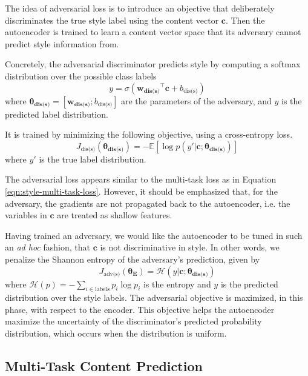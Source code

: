 \documentclass[letterpaper]{article} %
\newcommand{\loss}[1]{J_{\text{#1}}}
\newcommand{\nnweight}[1]{\bm{\theta_{\text{#1}}}}
\newcommand{\weight}[1]{\bm{w_{\text{#1}}}}
\newcommand{\bias}[1]{b_{\text{#1}}}
\begin{document}
The idea of adversarial loss is to introduce an objective that deliberately discriminates the true style label using the content vector $\bm c$.
Then the autoencoder is trained to learn a content vector space that its adversary cannot predict style information from.

Concretely, the adversarial discriminator predicts style by computing a softmax distribution over the possible class labels
\begin{equation}
	y = \sigma({\weight{dis(s)}}^\top \bm c + \bias{dis(s)})
\end{equation}
where $\nnweight{dis(s)}=[\weight{dis(s)}; \bias{dis(s)}]$ are the parameters of the adversary, and $y$ is the predicted label distribution.

It is trained by minimizing the following objective, using a cross-entropy loss.
\begin{equation} \label{eqn:adv-disc-loss}
	\loss{dis(s)} (\nnweight{dis(s)}) =
	- \mathbb{E} [\log p(y' | \bm c; \nnweight{dis(s)})]
\end{equation}
where $y'$ is the true label distribution.

The adversarial loss appears similar to the multi-task loss as in Equation \ref{eqn:style-multi-task-loss}.
However, it should be emphasized that, for the adversary, the gradients are not propagated back to the autoencoder, i.e. the variables in $\bm c$ are treated as shallow features.

Having trained an adversary, we would like the autoencoder to be tuned in such an \textit{ad hoc} fashion, that $\bm c$ is not discriminative in style.
In other words, we penalize the Shannon entropy of the adversary's prediction, given by
\begin{equation}
	\loss{adv(s)}(\nnweight{E})=\mathcal{H}(y|\bm c; \nnweight{dis(s)})
\end{equation}
where $\mathcal{H}(p)=-\sum_{i\in\text{labels}}p_i\log p_i$ is the entropy and $y$ is the predicted distribution over the style labels.
The adversarial objective is maximized, in this phase, with respect to the encoder.
This objective helps the autoencoder maximize the uncertainty of the discriminator's predicted probability distribution, which occurs when the distribution is uniform.


\subsection{Multi-Task Content Prediction} \label{ssec:multitask-content-objective}
\end{document}
